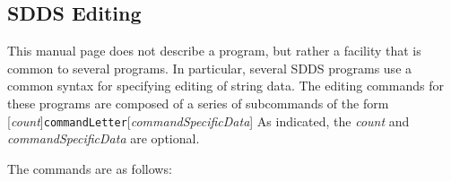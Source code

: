 \begin{latexonly}
\newpage
\end{latexonly}
\subsection{SDDS Editing}
\label{SDDS editing}

This manual page does not describe a program, but rather a facility that is common to several
programs.  In particular, several SDDS programs use a common syntax for specifying editing of
string data.  The editing commands for these programs are composed of a series of subcommands of
the form
[{\em count}]{\tt commandLetter}[{\em commandSpecificData}]
As indicated, the {\em count} and {\em commandSpecificData} are optional.

The commands are as follows:
